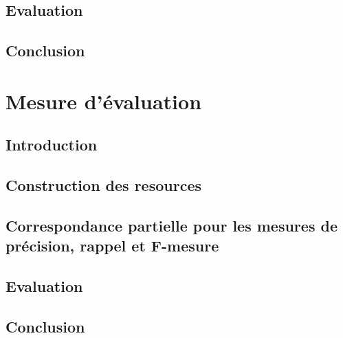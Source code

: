     \section{Evaluation}
    \label{sec:main-contributions-automatic_keyphrase_extraction-evaluation}

    \section{Conclusion}
    \label{sec:main-contributions-automatic_keyphrase_extraction-conclusion}


  \chapter{Mesure d'évaluation}
  \label{chap:main-contributions-evaluation}
    \section{Introduction}
    \label{sec:main-contributions-contributions-evaluation-introduction}

    \section{Construction des resources}
    \label{sec:main-contributions-contributions-evaluation-data_construction}

    \section{Correspondance partielle pour les mesures de précision, rappel et F-mesure}
    \label{sec:main-contributions-contributions-evaluation-soft_maching_precision_recall_and_f_measure}

    \section{Evaluation}
    \label{sec:main-contributions-contributions-evaluation-evaluation}

    \section{Conclusion}
    \label{sec:main-contributions-contributions-evaluation-conclusion}

